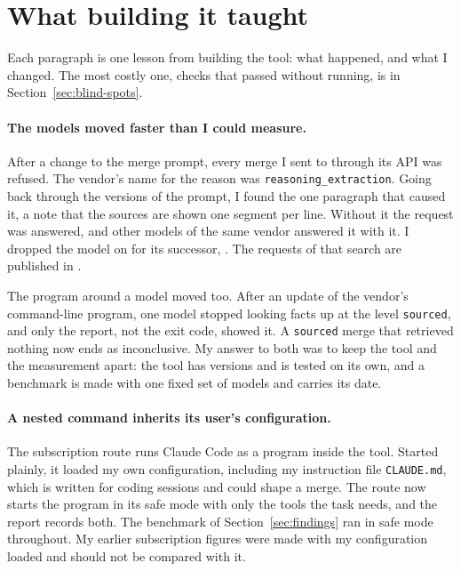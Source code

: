 \section{What building it taught}
\label{sec:lessons}

Each paragraph is one lesson from building the tool: what happened, and what I changed. The most costly one, checks that passed without running, is in Section~\ref{sec:blind-spots}.

\paragraph{The models moved faster than I could measure.} After a change to the merge prompt, every merge I sent to \texttt{} through its API was refused. The vendor's name for the reason was \texttt{reasoning\_extraction}. Going back through the versions of the prompt, I found the one paragraph that caused it, a note that the sources are shown one segment per line. Without it the request was answered, and other models of the same vendor answered it with it. I dropped the model on  for its successor, \texttt{}. The requests of that search are published in \texttt{}.

The program around a model moved too. After an update of the vendor's command-line program, one model stopped looking facts up at the level \texttt{sourced}, and only the report, not the exit code, showed it. A \texttt{sourced} merge that retrieved nothing now ends as inconclusive. My answer to both was to keep the tool and the measurement apart: the tool has versions and is tested on its own, and a benchmark is made with one fixed set of models and carries its date.

\paragraph{A nested command inherits its user's configuration.} The subscription route runs Claude Code as a program inside the tool. Started plainly, it loaded my own configuration, including my instruction file \texttt{CLAUDE.md}, which is written for coding sessions and could shape a merge. The route now starts the program in its safe mode with only the tools the task needs, and the report records both. The benchmark of Section~\ref{sec:findings} ran in safe mode throughout. My earlier subscription figures were made with my configuration loaded and should not be compared with it.

